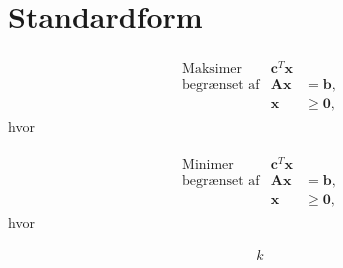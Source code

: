 \section{Standardform}
% 

\begin{align*}
\begin{array}{lrl}
\text{Maksimer}		&\textbf{c}^T\textbf{x}	&				\\
\text{begrænset af}	&\textbf{A}\textbf{x}	&=\mathbf{b},	\\
					&\mathbf{x}				&\geq \mathbf{0},		
\end{array}
\end{align*}
hvor 

\begin{align*}
\begin{array}{lrl}
\text{Minimer}		&\textbf{c}^T\textbf{x}	&				\\
\text{begrænset af}	&\textbf{A}\textbf{x}	&=\mathbf{b},	\\
					&\mathbf{x}				&\geq \mathbf{0},		
\end{array}
\end{align*}
hvor 

\begin{align*}
k
\end{align*}
